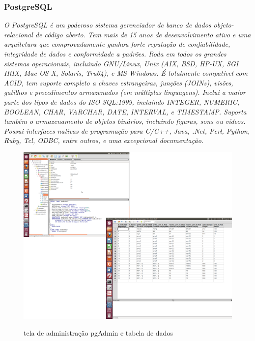 \documentclass[a4paper,10pt]{article}
\begin{document}
	\subsubsection{PostgreSQL}
	{\it O PostgreSQL é um poderoso sistema gerenciador de banco de dados objeto-relacional de código aberto.  
	Tem mais de 15 anos de desenvolvimento ativo e uma arquitetura que comprovadamente ganhou forte reputação 
	de confiabilidade, integridade de dados e conformidade a padrões.  Roda em todos os grandes sistemas operacionais, 
	incluindo GNU/Linux, Unix (AIX, BSD, HP-UX, SGI IRIX, Mac OS X, Solaris, Tru64), e MS Windows. É totalmente compatível
	 com ACID, tem suporte completo a chaves estrangeiras, junções (JOINs), visões, gatilhos e procedimentos armazenados
	 (em múltiplas linguagens).  Inclui a maior parte dos tipos de dados do ISO SQL:1999, incluindo INTEGER, NUMERIC, BOOLEAN, 
	CHAR, VARCHAR, DATE, INTERVAL, e TIMESTAMP.  Suporta também o armazenamento de objetos binários, incluindo figuras, sons ou
	 vídeos.  Possui interfaces nativas de programação para C/C++, Java, .Net, Perl, Python, Ruby, Tcl, ODBC, entre outros, e 
	uma excepcional documentação.}


	\begin{figure}[H]
	\centering
	\includegraphics[width=1.0\textwidth]{./imgs/pgAdminLibrary.png}\\[1cm]   
	\caption{tela de administração pgAdmin e tabela de dados}
	\label{telaPgAdmin}
      	\end{figure}
		
\end{document}
